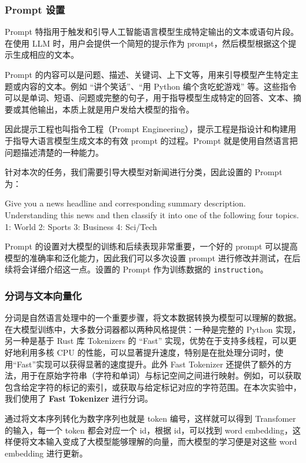 \subsubsection{Prompt 设置}

Prompt 特指用于触发和引导人工智能语言模型生成特定输出的文本或语句片段。在使用 LLM 时，用户会提供一个简短的提示作为 prompt，然后模型根据这个提示生成相应的文本。

Prompt 的内容可以是问题、描述、关键词、上下文等，用来引导模型产生特定主题或内容的文本。例如 ``讲个笑话''、``用 Python 编个贪吃蛇游戏'' 等。这些指令可以是单词、短语、问题或完整的句子，用于指导模型生成特定的回答、文本、摘要或其他输出，本质上就是用户发给大模型的指令。

因此提示工程也叫指令工程（Prompt Engineering），提示工程是指设计和构建用于指导大语言模型生成文本的有效 prompt 的过程。Prompt 就是使用自然语言把问题描述清楚的一种能力。

针对本次的任务，我们需要引导大模型对新闻进行分类，因此设置的 Prompt 为：\begin{textcode}
    Give you a news headline and corresponding summary description. Understanding this news and then classify it into one of the following four topics.
    1: World
    2: Sports
    3: Business
    4: Sci/Tech
\end{textcode}

Prompt 的设置对大模型的训练和后续表现非常重要，一个好的 prompt 可以提高模型的准确率和泛化能力，因此我们可以多次设置 prompt 进行修改并测试，在后续将会详细介绍这一点。设置的 Prompt 作为训练数据的 \texttt{instruction}。

\subsubsection{分词与文本向量化}

分词是自然语言处理中的一个重要步骤，将文本数据转换为模型可以理解的数据。在大模型训练中，大多数分词器都以两种风格提供：一种是完整的 Python 实现，另一种是基于 Rust 库 Tokenizers 的 ``Fast'' 实现，优势在于支持多线程，可以更好地利用多核 CPU 的性能，可以显著提升速度，特别是在批处理分词时，使用``Fast''实现可以获得显著的速度提升。此外 Fast Tokenizer 还提供了额外的方法，用于在原始字符串（字符和单词）与标记空间之间进行映射。例如，可以获取包含给定字符的标记的索引，或获取与给定标记对应的字符范围。在本次实验中，我们使用了 \textbf{Fast Tokenizer} 进行分词。

通过将文本序列转化为数字序列也就是 token 编号，这样就可以得到 Transfomer 的输入，每一个 token 都会对应一个 id，根据 id，可以找到 word embedding，这样便将文本输入变成了大模型能够理解的向量，而大模型的学习便是对这些 word embedding 进行更新。

